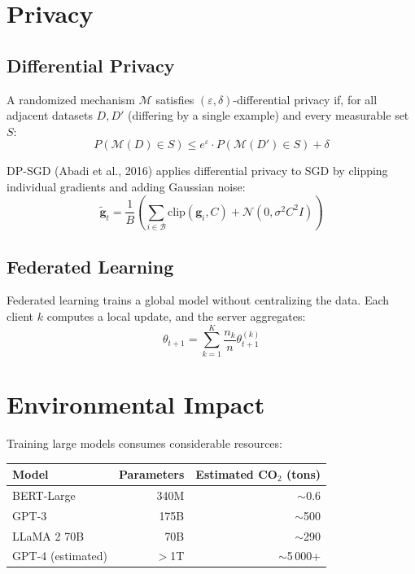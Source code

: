 \section{Privacy}
\label{sec:privacy}

\subsection{Differential Privacy}

\begin{definition}
A randomized mechanism $\mathcal{M}$ satisfies $(\varepsilon,\delta)$-differential privacy if, for all adjacent datasets $D, D'$ (differing by a single example) and every measurable set $S$:
\[
P(\mathcal{M}(D) \in S) \leq e^\varepsilon \cdot P(\mathcal{M}(D') \in S) + \delta
\]
\end{definition}

DP-SGD (Abadi et al., 2016) applies differential privacy to SGD by clipping individual gradients and adding Gaussian noise:
\[
\tilde{\bm{g}}_t = \frac{1}{B}\left(\sum_{i \in \mathcal{B}} \mathrm{clip}(\bm{g}_i, C) + \mathcal{N}(0, \sigma^2 C^2 I)\right)
\]

\subsection{Federated Learning}

Federated learning trains a global model without centralizing the data. Each client $k$ computes a local update, and the server aggregates:
\[
\theta_{t+1} = \sum_{k=1}^K \frac{n_k}{n} \theta_{t+1}^{(k)}
\]

\section{Environmental Impact}
\label{sec:environment}

Training large models consumes considerable resources:

\begin{center}
\begin{tabular}{lrr}
\toprule
\textbf{Model} & \textbf{Parameters} & \textbf{Estimated CO$_2$ (tons)} \\
\midrule
BERT-Large & 340M & $\sim$0.6 \\
GPT-3 & 175B & $\sim$500 \\
LLaMA 2 70B & 70B & $\sim$290 \\
GPT-4 (estimated) & $>$1T & $\sim$5\,000+ \\
\bottomrule
\end{tabular}
\end{center}

